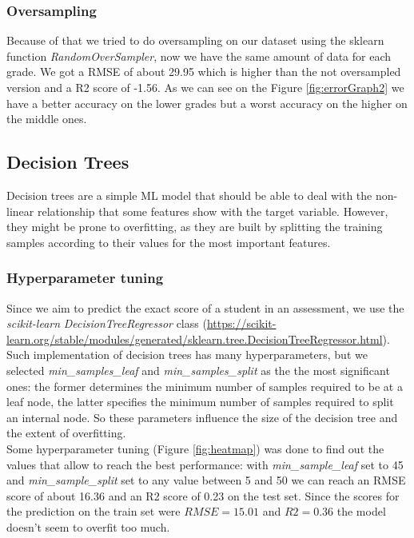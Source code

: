 \documentclass{article}
\begin{document}
\subsubsection{Oversampling}
Because of that we tried to do oversampling on our dataset using the sklearn function \textit{RandomOverSampler}, now we have the same amount of data for each grade. 
We got a RMSE of about 29.95 which is higher than the not oversampled version and a R2 score of -1.56. As we can see on the Figure \ref{fig:errorGraph2} we have a better accuracy on the lower grades but a worst accuracy on the higher on the middle ones.






\FloatBarrier

\subsection{Decision Trees}

Decision trees are a simple ML model that should be able to deal with the non-linear relationship that some features show with the target variable. However, they might be prone to overfitting, as they are built by splitting the training samples according to their values for the most important features.

\subsubsection{Hyperparameter tuning}
Since we aim to predict the exact score of a student in an assessment, we use the \textit{scikit-learn} \textit{DecisionTreeRegressor} class (\url{https://scikit-learn.org/stable/modules/generated/sklearn.tree.DecisionTreeRegressor.html}). Such implementation of decision trees has many hyperparameters, but we selected \textit{min\_samples\_leaf} and \textit{min\_samples\_split} as the the most significant ones: the former determines the minimum number of samples required to be at a leaf node, the latter specifies the minimum number of samples required to split an internal node. So these parameters influence the size of the decision tree and the extent of overfitting.\\

Some hyperparameter tuning (Figure \ref{fig:heatmap}) was done to find out the values that allow to reach the best performance: with \textit{min\_sample\_leaf} set to 45 and \textit{min\_sample\_split} set to any value between 5 and 50 we can reach an RMSE score of about 16.36 and an R2 score of 0.23 on the test set. Since the scores for the prediction on the train set were $RMSE = 15.01$ and $R2 = 0.36$ the model doesn't seem to overfit too much. \\
\end{document}
